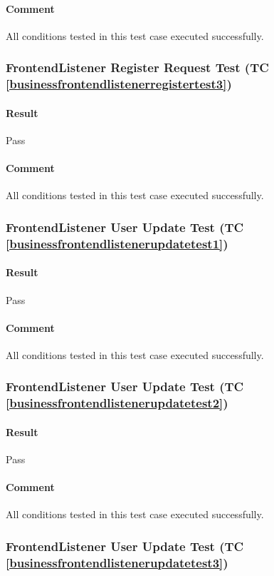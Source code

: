 \documentclass[hidelinks,english]{article}
\begin{document}
				\paragraph{Comment} All conditions tested in this test case executed successfully.
				
			\subsubsection{FrontendListener Register Request Test (TC \ref{businessfrontendlistenerregistertest3})}
				\paragraph{Result} Pass
				\paragraph{Comment} All conditions tested in this test case executed successfully.
				
			\subsubsection{FrontendListener User Update Test (TC \ref{businessfrontendlistenerupdatetest1})}
				\paragraph{Result} Pass
				\paragraph{Comment} All conditions tested in this test case executed successfully.
				
			\subsubsection{FrontendListener User Update Test (TC \ref{businessfrontendlistenerupdatetest2})}
				\paragraph{Result} Pass
				\paragraph{Comment} All conditions tested in this test case executed successfully.
				
			\subsubsection{FrontendListener User Update Test (TC \ref{businessfrontendlistenerupdatetest3})}
\end{document}
